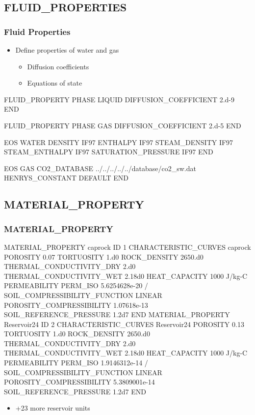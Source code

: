 \documentclass{beamer}
\begin{document}
\subsection{FLUID\_PROPERTIES}
\begin{frame}\frametitle{Fluid Properties}

\begin{itemize}
  \item Define properties of water and gas
  \begin{itemize}
    \item Diffusion coefficients
    \item Equations of state
  \end{itemize}
\end{itemize}

\begin{semiverbatim}
FLUID_PROPERTY
  PHASE LIQUID
  DIFFUSION_COEFFICIENT 2.d-9
END

FLUID_PROPERTY
  PHASE GAS
  DIFFUSION_COEFFICIENT 2.d-5
END

\newpage

EOS WATER
  DENSITY IF97
  ENTHALPY IF97
  STEAM_DENSITY IF97
  STEAM_ENTHALPY IF97
  SATURATION_PRESSURE IF97
END

EOS GAS
  CO2_DATABASE ../../../../../database/co2_sw.dat
  HENRYS_CONSTANT DEFAULT
END

\end{semiverbatim}

\end{frame}
\subsection{MATERIAL\_PROPERTY}

\begin{frame}\frametitle{MATERIAL\_PROPERTY}

\begin{semiverbatim}
MATERIAL_PROPERTY caprock
  ID 1
  CHARACTERISTIC_CURVES caprock
  POROSITY 0.07
  TORTUOSITY 1.d0
  ROCK_DENSITY 2650.d0
  THERMAL_CONDUCTIVITY_DRY 2.d0
  THERMAL_CONDUCTIVITY_WET 2.18d0
  HEAT_CAPACITY 1000 J/kg-C
  PERMEABILITY
    PERM_ISO 5.6254628e-20
  /
  SOIL_COMPRESSIBILITY_FUNCTION LINEAR
  POROSITY_COMPRESSIBILITY 1.07618e-13
  SOIL_REFERENCE_PRESSURE 1.2d7
END \newpage
MATERIAL_PROPERTY Reservoir24
  ID 2
  CHARACTERISTIC_CURVES Reservoir24
  POROSITY 0.13
  TORTUOSITY 1.d0
  ROCK_DENSITY 2650.d0
  THERMAL_CONDUCTIVITY_DRY 2.d0
  THERMAL_CONDUCTIVITY_WET 2.18d0
  HEAT_CAPACITY 1000 J/kg-C
  PERMEABILITY
    PERM_ISO 1.9146312e-14
  /
  SOIL_COMPRESSIBILITY_FUNCTION LINEAR
  POROSITY_COMPRESSIBILITY 5.3809001e-14
  SOIL_REFERENCE_PRESSURE 1.2d7
END
\end{semiverbatim}
\newpage
\begin{itemize}
  \item +23 more reservoir units
\end{itemize}

\end{frame}
\end{document}
